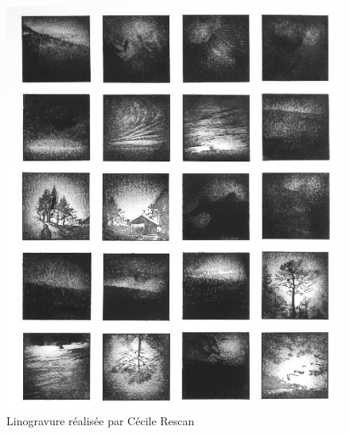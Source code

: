 \documentclass[12pt,twoside,a4paper, a]{article}
\begin{document}
  \cleardoublepage
    \null\vfill
    \begin{figure}[h!]
    \centering
      \includegraphics{img/cecile_rescan/cecile_rescan_page.jpg}
      \caption*{Linogravure réalisée par Cécile Rescan}
    \end{figure}
    \vfill\null
  \newpage
  \null\vfill
\end{document}
